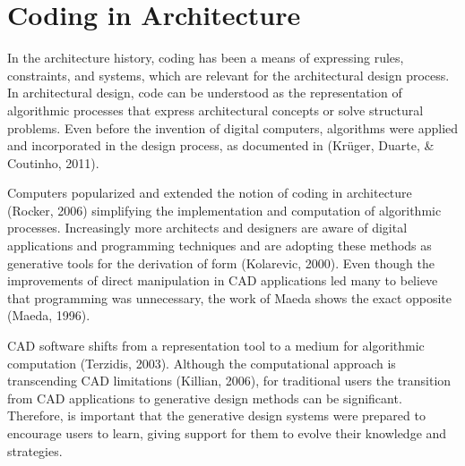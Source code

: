 \section{Coding in Architecture}

In the architecture history, coding has been a means of expressing rules, constraints, and systems, which are relevant for the architectural design process. In architectural design, code can be understood as the representation of algorithmic processes that express architectural concepts or solve structural problems. Even before the invention of digital computers, algorithms were applied and incorporated in the design process, as documented in (Krüger, Duarte, \& Coutinho, 2011).

Computers popularized and extended the notion of coding in architecture (Rocker, 2006) simplifying the implementation and computation of algorithmic processes. Increasingly more architects and designers are aware of digital applications and programming techniques and are adopting these methods as generative tools for the derivation of form (Kolarevic, 2000). Even though the improvements of direct manipulation in CAD applications led many to believe that programming was unnecessary, the work of Maeda shows the exact opposite (Maeda, 1996).

CAD software shifts from a representation tool to a medium for algorithmic computation (Terzidis, 2003). Although the computational approach is transcending CAD limitations (Killian, 2006), for traditional users the transition from CAD applications to generative design methods can be significant. Therefore, is important that the generative design systems were prepared to encourage users to learn, giving support for them to evolve their knowledge and strategies.